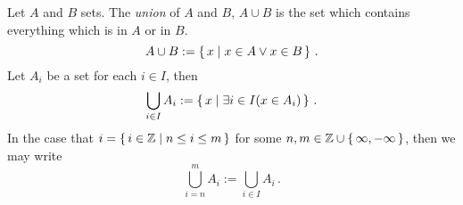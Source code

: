 \guard




\begin{defn}
\label{defn:union}
  Let $A$ and $B$ sets.
  The \emph{union} of $A$ and $B$, $A\cup B$ is the set which contains everything which is in $A$ or in $B$.
  \[ A\cup B := \left\{\, x \mid x\in A \vee x\in B\,\right\}\,.\]
  Let $A_i$ be a set for each $i\in I$, then \[ \bigcup_{i\in I} A_i:=\left\{\, x\mid \exists i\in I(x\in A_i)\,\right\}\,.\]
  In the case that $i=\left\{\,i\in\mathbb{Z}\mid n\leq i \leq m \,\right\}$ for some $n,m\in\mathbb{Z}\cup\left\{\,\infty,-\infty\,\right\}$, then we may write \[ \bigcup_{i=n}^m A_i := \bigcup_{i\in I} A_i\,.\]
\end{defn}
